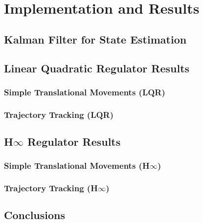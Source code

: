\chapter{Implementation and Results} \label{ch:implementation}

\section{Kalman Filter for State Estimation}

\section{Linear Quadratic Regulator Results}


\subsection{Simple Translational Movements (LQR)}

\subsection{Trajectory Tracking (LQR)}


\section{H$\infty$ Regulator Results}


\subsection{Simple Translational Movements (H$\infty$)}

\subsection{Trajectory Tracking (H$\infty$)}

\section{Conclusions}
